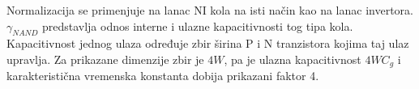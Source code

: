 Normalizacija se primenjuje na lanac NI kola na isti način kao na lanac invertora. $\gamma_{NAND}$ predstavlja odnos interne i ulazne kapacitivnosti tog tipa kola. Kapacitivnost jednog ulaza određuje zbir širina P i N tranzistora kojima taj ulaz upravlja. Za prikazane dimenzije zbir je $4W$, pa je ulazna kapacitivnost $4WC_g$ i karakteristična vremenska konstanta dobija prikazani faktor 4.
